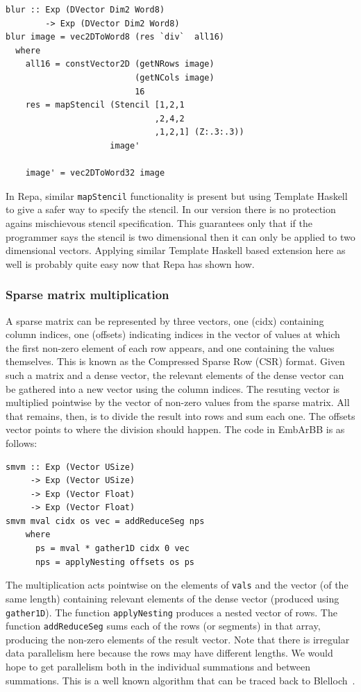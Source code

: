 \begin{verbatim} 
blur :: Exp (DVector Dim2 Word8) 
        -> Exp (DVector Dim2 Word8) 
blur image = vec2DToWord8 (res `div`  all16) 
  where 
    all16 = constVector2D (getNRows image) 
                          (getNCols image)
                          16
    res = mapStencil (Stencil [1,2,1
                              ,2,4,2   
                              ,1,2,1] (Z:.3:.3)) 
                     image' 
     
    image' = vec2DToWord32 image        
\end{verbatim}

In Repa, similar {\tt mapStencil} functionality is present but using Template 
Haskell to give a safer way to specify the stencil. In our version there is 
no protection agains mischievous stencil specification. This guarantees only
that if the programmer says the stencil is two dimensional then it can only 
be applied to two dimensional vectors. Applying similar Template Haskell based
extension here as well is probably quite easy now that Repa has shown how.

\subsubsection{Sparse matrix multiplication}\label{sec:smvm}
A sparse matrix can be represented by three vectors, one (cidx) containing
column indices, one (offsets) indicating indices in the vector of values
at which the first non-zero element of each row appears, and one containing the
values themselves. This is known as the Compressed Sparse Row (CSR) format.
Given such a matrix and a dense vector, the relevant elements of the dense vector
can be gathered into a new vector using the column indices. The resuting vector
is multiplied pointwise by the vector of non-zero values from the sparse matrix. All that remains, then, is to divide the result into rows and sum each one. The offsets vector
points to where the division should happen.
The code in EmbArBB is as follows:

\begin{verbatim} 
smvm :: Exp (Vector USize)
     -> Exp (Vector USize)
     -> Exp (Vector Float)
     -> Exp (Vector Float)
smvm mval cidx os vec = addReduceSeg nps 
    where 
      ps = mval * gather1D cidx 0 vec
      nps = applyNesting offsets os ps 
\end{verbatim} 

The multiplication acts pointwise on the elements of {\tt vals}
and the vector (of the same length) containing relevant elements of the dense vector (produced using {\tt gather1D}).
The function {\tt applyNesting} produces
a nested vector of rows. The function {\tt addReduceSeg} sums each
of the rows (or segments) in that array, producing the non-zero elements
of the result vector. Note that there is irregular data parallelism
here because the rows may have different lengths. We would hope
to get parallelism both in the individual summations and between summations.
This is a well known algorithm that can be traced back to Blelloch~\cite{NESL}.


